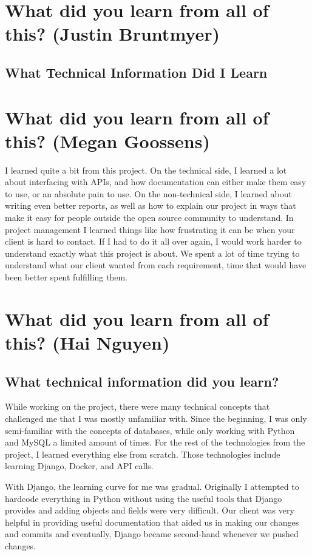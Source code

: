 \documentclass[draftclsnofoot,10pt,onecolumn]{IEEEtran} %
\begin{document}
\section{What did you learn from all of this? (Justin Bruntmyer)}

\subsection{What Technical Information Did I Learn}

\section{What did you learn from all of this? (Megan Goossens)}
I learned quite a bit from this project. On the technical side, I learned a lot
about interfacing with APIs, and how documentation can either make them easy to
use, or an absolute pain to use. On the non-technical side, I learned about
writing even better reports, as well as how to explain our project in ways that
make it easy for people outside the open source community to understand.  In
project management I learned things like how frustrating it can be when your
client is hard to contact. If I had to do it all over again, I would work harder
to understand exactly what this project is about. We spent a lot of time trying
to understand what our client wanted from each requirement, time that would have
been better spent fulfilling them.

\section{What did you learn from all of this? (Hai Nguyen)}

\subsection{What technical information did you learn?}
While working on the project, there were many technical concepts that challenged
me that I was mostly unfamiliar with. Since the beginning, I was only
semi-familiar with the concepts of databases, while only working with Python and
MySQL a limited amount of times. For the rest of the technologies from the
project, I learned everything else from scratch. Those technologies include
learning Django, Docker, and API calls. 

With Django, the learning curve for me was gradual. Originally I attempted to
hardcode everything in Python without using the useful tools that Django
provides and adding objects and fields were very difficult. Our client was very
helpful in providing useful documentation that aided us in making our changes
and commits and eventually, Django became second-hand whenever we pushed
changes. 
\end{document}
